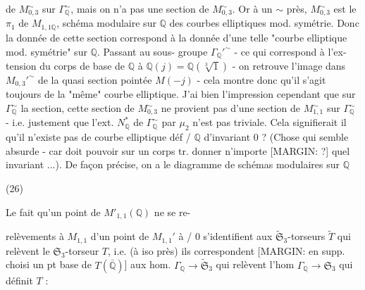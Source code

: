 \begin{enumerate}
de $M_{0,3}^\sim$ sur $\Gamma_{\mathbb{Q}}^\sim$, mais on n'a pas une
section de $M_{0,3}^\sim$. Or à un $\sim$ près, $M_{0,3}^\sim$
est le $\pi_1$ de $M_{1,1 \mathbb{Q}}$, schéma modulaire sur $\mathbb{Q}$
des courbes elliptiques mod. symétrie.
Donc la donnée de cette section correspond à
la donnée d'une telle "courbe elliptique
mod. symétrie" sur $\mathbb{Q}$. Passant au sous-
groupe $\Gamma_{\mathbb{Q}}'^\sim$ - ce qui correspond à l'ex-
tension du corps de base de $\mathbb{Q}$ à $\mathbb{Q}(j) = \mathbb{Q}(\sqrt[3]{1})$ -
on retrouve l'image dans $M_{0,3}'^\sim$ de la quasi
section pointée $M(-j)$ - cela montre
donc qu'il s'agit toujours de la "même" courbe
elliptique. J'ai bien l'impression cependant
que sur $\Gamma_{\mathbb{Q}}^\sim$ la section, cette section de
$M_{0,3}^\sim$ ne provient pas d'une section
de $M_{1,1}^\sim$ sur $\Gamma_{\mathbb{Q}}^\sim$ - i.e. justement que l'ext. $N_{\mathbb{Q}}^*$
de $\Gamma_{\mathbb{Q}}^\sim$ par $\mu_2$ n'est pas triviale. Cela signifierait
il qu'il n'existe pas de courbe elliptique
déf / $\mathbb{Q}$ d'invariant $0$ ? (Chose qui semble absurde
- car doit pouvoir sur un corps tr. donner n'importe
[MARGIN: ?] quel invariant ...). De façon précise, on a le
diagramme de schémas modulaires sur $\mathbb{Q}$

(26)

Le fait qu'un point de $M'_{1,1}(\mathbb{Q})$ ne se re-

\newpage



\newpage


relèvements à $M_{1,1}$ d'un point de $M_{1,1}'$ à / 0
s'identifient aux $\widetilde{\mathfrak{S}}_3$-torseurs $\widetilde{T}$ qui relèvent le
$\mathfrak{S}_3$-torseur $T$, i.e. (à iso près) ils correspondent
[MARGIN: en supp. choisi un pt base de $T(\bar{\mathbb{Q}})$]
aux hom. $\Gamma_{\mathbb{Q}} \to \widetilde{\mathfrak{S}}_3$ qui relèvent l'hom
$\Gamma_{\mathbb{Q}} \to \mathfrak{S}_3$ qui définit $T$ :



\end{enumerate}
